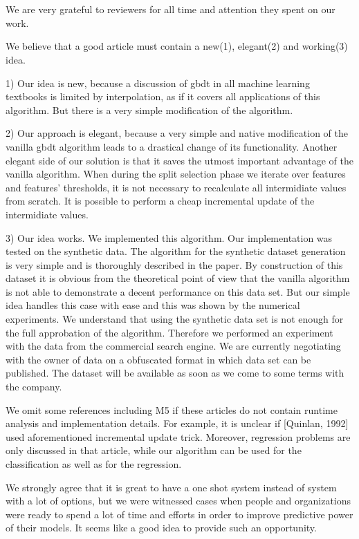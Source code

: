 \documentclass[a4paper,12pt]{extarticle}
\begin{document}
\section{}

We are very grateful to reviewers for all time and attention they spent on our work.

We believe that a good article must contain a new(1), elegant(2) and working(3) idea.

1) Our idea is new, because a discussion of gbdt in all machine learning textbooks is limited by interpolation, as if it covers all applications of this algorithm.
But there is a very simple modification of the algorithm.

2) Our approach is elegant, because a very simple and native modification of the vanilla gbdt algorithm leads to a drastical change of its functionality.
Another elegant side of our solution is that it saves the utmost important advantage of the vanilla algorithm.
When during the split selection phase we iterate over features and features' thresholds,
it is not necessary to recalculate all intermidiate values from scratch.
It is possible to perform a cheap incremental update of the intermidiate values.

3) Our idea works.
We implemented this algorithm.
Our implementation was tested on the synthetic data.
The algorithm for the synthetic dataset generation is very simple and is thoroughly described in the paper.
By construction of this dataset it is obvious from the theoretical point of view that the vanilla algorithm is not able to demonstrate a decent performance on this data set.
But our simple idea handles this case with ease and this was shown by the numerical experiments.
We understand that using the synthetic data set is not enough for the full approbation of the algorithm.
Therefore we performed an experiment with the data from the commercial search engine.
We are currently negotiating with the owner of data on a obfuscated format in which data set can be published. The dataset will be available as soon as we come to some terms with the company. 
 
We omit some references including M5 if these articles do not contain runtime analysis and implementation details.
For example, it is unclear if [Quinlan, 1992] used aforementioned incremental update trick.
Moreover, regression problems are only discussed in that article, while our algorithm can be used for the classification as well as for the regression.

We strongly agree that it is great to have a one shot system instead of system with a lot of options, but we were witnessed cases when people and organizations were ready to spend a lot of time and efforts in order to improve predictive power of their models. It seems like a good idea to provide such an opportunity.
\end{document}
